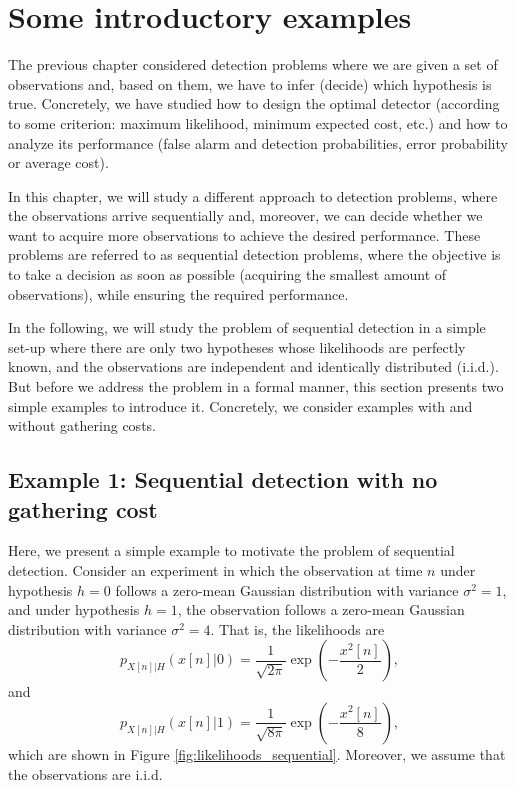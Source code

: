 \section{Some introductory examples}

The previous chapter considered detection problems where we are given a set of observations and, based on them, we have to infer (decide) which hypothesis is true. Concretely, we have studied how to design the optimal detector (according to some criterion: maximum likelihood, minimum expected cost, etc.) and how to analyze its performance (false alarm and detection probabilities, error probability or average cost). 

In this chapter, we will study a different approach to detection problems, where the observations arrive sequentially and, moreover, we can decide whether we want to acquire more observations to achieve the desired performance. These problems are referred to as sequential detection problems, where the objective is to take a decision as soon as possible (acquiring the smallest amount of observations), while ensuring the required performance. 

In the following, we will study the problem of sequential detection in a simple set-up where there are only two hypotheses whose likelihoods are perfectly known, and the observations are independent and identically distributed (i.i.d.). But before we address the problem in a formal manner, this section presents two simple examples to introduce it. Concretely, we consider examples with and without gathering costs.

\subsection{Example 1: Sequential detection with no gathering cost}

Here, we present a simple example to motivate the problem of sequential detection. Consider an experiment in which the observation at time $n$ under hypothesis $h = 0$ follows a zero-mean Gaussian distribution with variance $\sigma^2 = 1$, and under hypothesis $h = 1$, the observation follows a zero-mean Gaussian distribution with variance $\sigma^2 = 4$. That is, the likelihoods are
\begin{equation}
	\label{eq:likelihood_0}
	p_{X[n] | H} (x[n] | 0) = \frac{1}{\sqrt{2 \pi}} \exp \left(-\frac{x^2[n]}{2}\right),
\end{equation}
and
\begin{equation}
	\label{eq:likelihood_1}
	p_{X[n] | H} (x[n] | 1) = \frac{1}{\sqrt{8 \pi}} \exp \left(-\frac{x^2[n]}{8}\right),
\end{equation}
which are shown in Figure \ref{fig:likelihoods_sequential}. Moreover, we assume that the observations are i.i.d.

